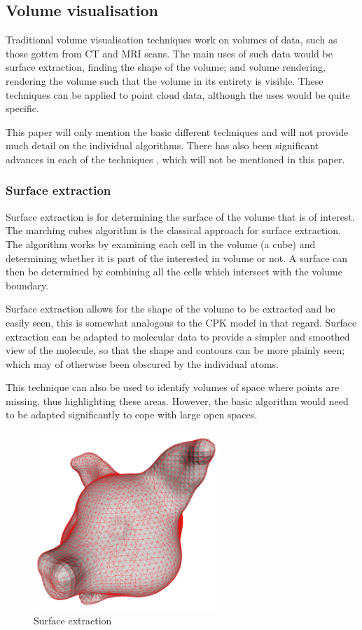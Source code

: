\documentclass[a4paper]{article}
\begin{document}
\subsection*{Volume visualisation}
Traditional volume visualisation techniques work on volumes of data, such as
those gotten from CT and MRI scans. The main uses of such data would be surface
extraction, finding the shape of the volume; and volume rendering, rendering the
volume such that the volume in its entirety is visible. These techniques can be
applied to point cloud data, although the uses would be quite specific.

This paper will only mention the basic different techniques and will not provide
much detail on the individual algorithms. There has also been significant
advances in each of the techniques \citep{brodlie01}, which will not be
mentioned in this paper.

\subsubsection*{Surface extraction}
Surface extraction is for determining the surface of the volume that is of
interest. The marching cubes algorithm \citep{lorensen87} is the classical
approach for surface extraction. The algorithm works by examining each cell in
the volume (a cube) and determining whether it is part of the interested in
volume or not. A surface can then be determined by combining all the cells which
intersect with the volume boundary.

Surface extraction allows for the shape of the volume to be extracted and be
easily seen, this is somewhat analogous to the CPK model in that regard. Surface
extraction can be adapted to molecular data to provide a simpler and smoothed
view of the molecule, so that the shape and contours can be more plainly seen;
which may of otherwise been obscured by the individual atoms.

This technique can also be used to identify volumes of space where points are
missing, thus highlighting these areas. However, the basic algorithm would need
to be adapted significantly to cope with large open spaces.

\begin{figure}[h!]
  \begin{center}
    \includegraphics[width=70mm]{triangulated_mesh}
  \end{center}
  \caption{Surface extraction}
  \label{fig:triangulatedmesh}
\end{figure}
\end{document}
